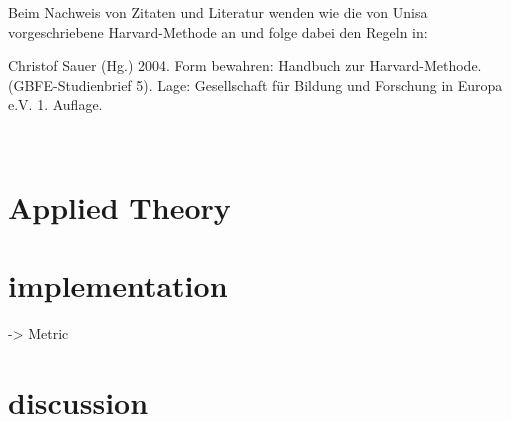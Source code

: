 \documentclass[a4paper,12pt]{scrartcl}
\begin{document}
\begin{singlespace}
\begin{titlepage}
			\flushleft
		\end{titlepage}
		
		\newpage  \tableofcontents \thispagestyle{empty} \vspace{15mm}
		\begin{center}
			\parbox{.8\linewidth}{\begin{small}
					{Beim Nachweis von Zitaten und Literatur wenden wie die von Unisa 
						vorgeschriebene Harvard-Methode an und folge dabei den Regeln 
						in: 
						
						Christof Sauer (Hg.) 2004. 
						Form bewahren: Handbuch zur 
						Harvard-Methode. 
						(GBFE-Studienbrief 5). Lage: Gesellschaft für 
						Bildung und Forschung in Europa e.V. 1. Auflage.} \\
					
			\end{small}}
		\end{center}
		
	\end{singlespace}

\newpage
\setcounter{page}{1}









\section{Applied Theory}



















\section{implementation}
-> Metric

\section{discussion}
\end{document}
